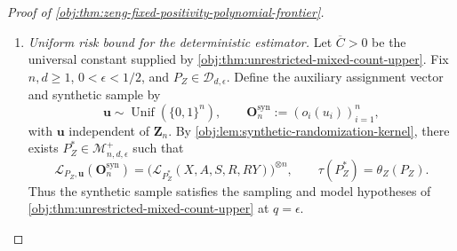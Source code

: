 \documentclass[11pt]{article}
\begin{document}
\begin{proof}[Proof of \cref{obj:thm:zeng-fixed-positivity-polynomial-frontier}]
\begin{enumerate}
\item \textit{Uniform risk bound for the deterministic estimator.}
Let \(\overline C>0\) be the universal constant supplied by
\cref{obj:thm:unrestricted-mixed-count-upper}. Fix \(n,d\ge1\),
\(0<\epsilon<1/2\), and \(P_Z\in\mathcal D_{d,\epsilon}\).
Define the auxiliary assignment vector and synthetic sample by
\[
\mathbf u\sim\operatorname{Unif}(\{0,1\}^n),
\qquad
\mathbf O_n^{\mathrm{syn}}
:=(o_i(u_i))_{i=1}^n,
\]
with \(\mathbf u\) independent of \(\mathbf Z_n\).
By \cref{obj:lem:synthetic-randomization-kernel}, there exists
\(P_Z^*\in\mathcal M^+_{n,d,\epsilon}\) such that
\[
\mathcal L_{P_Z,\mathbf u}(\mathbf O_n^{\mathrm{syn}})
=
\bigl(\mathcal L_{P_Z^*}(X,A,S,R,RY)\bigr)^{\otimes n},
\qquad
\tau(P_Z^*)=\theta_Z(P_Z).
\]
Thus the synthetic sample satisfies the sampling and model hypotheses of
\cref{obj:thm:unrestricted-mixed-count-upper} at \(q=\epsilon\).


\end{enumerate}
\end{proof}
\end{document}
